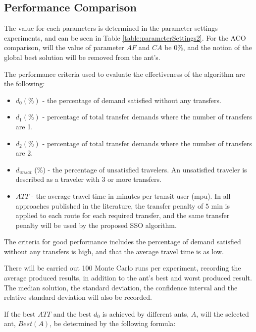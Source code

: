 \subsection{Performance Comparison}
\label{subsec:performanceComparison_setup}

The value for each parameters is determined in the parameter settings experiments, and can be seen in Table \vref{table:parameterSettings2}. For the ACO comparison, will the value of parameter $AF$ and $CA$ be 0\%, and the notion of the global best solution will be removed from the ant's. 

The performance criteria used to evaluate the effectiveness of the algorithm are the following:
\begin{itemize}
\item $d_0 (\%)$ - the percentage of demand satisfied without any transfers. 
\item $d_1 (\%)$ - percentage of total transfer demands where the number of transfers are 1. 
\item $d_2 (\%)$ - percentage of total transfer demands where the number of transfers are 2. 
\item $d_{unsat}$ (\%) - the percentage of unsatisfied travelers. An unsatisfied traveler is described as a traveler with 3 or more transfers. 
\item $ATT$  - the average travel time in minutes per transit user (mpu). In all approaches published in the literature, the transfer penalty of 5 min is applied to each route for each required transfer, and the same transfer penalty will be used by the proposed SSO algorithm.
\end{itemize}
The criteria for good performance includes the percentage of demand satisfied without any transfers is high, and that the average travel time is as low.

There will be carried out 100 Monte Carlo runs per experiment, recording the average produced results, in addition to the ant's best and worst produced result. The median solution, the standard deviation, the confidence interval and the relative standard deviation will also be recorded. 

If the best $ATT$ and the best $d_0$ is achieved by different ants, $A$, will the selected ant, $Best(A)$, be determined by the following formula:

